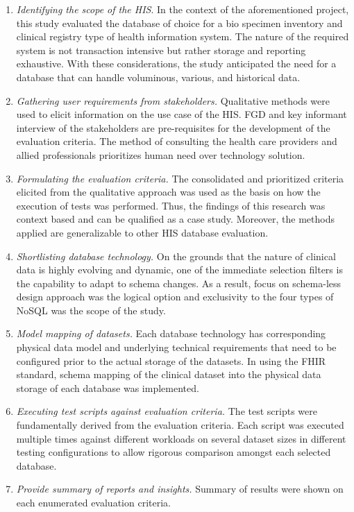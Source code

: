 \documentclass[5p]{elsarticle}
\begin{document}
\begin{enumerate}
\item \emph{Identifying the scope of the HIS}. In the context of the aforementioned project, this study evaluated the database of choice for a bio specimen inventory and clinical registry type of health information system. The nature of the required system is not transaction intensive but rather storage and reporting exhaustive. With these considerations, the study anticipated the need for a database that can handle voluminous, various, and historical data.
\item \emph{Gathering user requirements from stakeholders.} Qualitative methods were used to elicit information on the use case of the HIS. FGD and key informant interview of the stakeholders are pre-requisites for the development of the evaluation criteria. The method of consulting the health care providers and allied professionals prioritizes human need over technology solution.
\item \emph{Formulating the evaluation criteria.} The consolidated and prioritized criteria elicited from the qualitative approach was used as the basis on how the execution of tests was performed. Thus, the findings of this research was context based and can be qualified as a case study. Moreover, the methods applied are generalizable to other HIS database evaluation.
\item \emph{Shortlisting database technology.} On the grounds that the nature of clinical data is highly evolving and dynamic, one of the immediate selection filters is the capability to adapt to schema changes. As a result, focus on schema-less design approach was the logical option and exclusivity to the four types of NoSQL was the scope of the study.
\item \emph{Model mapping of datasets.} Each database technology has corresponding physical data model and underlying technical requirements that need to be configured prior to the actual storage of the datasets. In using the FHIR standard, schema mapping of the clinical dataset into the physical data storage of each database was implemented.
\item \emph{Executing test scripts against evaluation criteria.} The test scripts were fundamentally derived from the evaluation criteria. Each script was executed multiple times against different workloads on several dataset sizes in different testing configurations to allow rigorous comparison amongst each selected database.
\item \emph{Provide summary of reports and insights.} Summary of results were shown on each enumerated evaluation criteria.
\end{enumerate}
\end{document}

